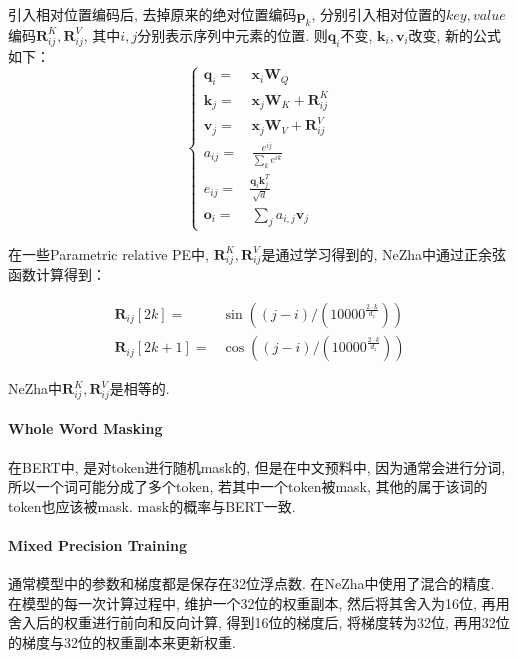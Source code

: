 引入相对位置编码后, 去掉原来的绝对位置编码$\boldsymbol{p}_k$, 分别引入相对位置的$key, value$编码$\boldsymbol{R}_{ij}^K, \boldsymbol{R}_{ij}^V$, 其中$i, j$分别表示序列中元素的位置. 则$\boldsymbol{q}_i$不变, $\boldsymbol{k}_i, \boldsymbol{v}_i$改变, 新的公式如下：
$$
\begin{equation}\nonumber
	\left\{
	\begin{aligned} 
		\boldsymbol{q}_i =&\, \boldsymbol{x}_i \boldsymbol{W}_Q \\ 
		\boldsymbol{k}_j =&\, \boldsymbol{x}_j \boldsymbol{W}_K + \boldsymbol{R}_{ij}^K \\ 
		\boldsymbol{v}_j =&\, \boldsymbol{x}_j \boldsymbol{W}_V + \boldsymbol{R}_{ij}^V \\ 
		a_{ij} =&\, \frac{e^{ij}}{\sum_k e^{ik}}\\ 
		e_{ij} =& \frac{\boldsymbol{q}_i \boldsymbol{k}_j^T}{\sqrt{d}}\\
		\boldsymbol{o}_i =&\, \sum_j a_{i,j}\boldsymbol{v}_j 
	\end{aligned}\right.
\end{equation}
$$

在一些Parametric relative PE中, $\boldsymbol{R}_{ij}^K, \boldsymbol{R}_{ij}^V$是通过学习得到的, NeZha中通过正余弦函数计算得到：

\begin{equation}
	\begin{aligned}
		\boldsymbol{R}_{ij}[2 k] =& \sin \left((j-i) /\left(10000^{\frac{2 \cdot k}{d_{z}}}\right)\right) \\
		\boldsymbol{R}_{ij}[2 k+1] =& \cos \left((j-i) /\left(10000^{\frac{2 \cdot k}{d_{z}}}\right)\right)
	\end{aligned}
\end{equation}

NeZha中$\boldsymbol{R}_{ij}^K, \boldsymbol{R}_{ij}^V$是相等的. 

\paragraph{Whole Word Masking}
在BERT中, 是对token进行随机mask的, 但是在中文预料中, 因为通常会进行分词, 所以一个词可能分成了多个token, 若其中一个token被mask, 其他的属于该词的token也应该被mask. mask的概率与BERT一致. 

\paragraph{Mixed Precision Training}
通常模型中的参数和梯度都是保存在32位浮点数. 在NeZha中使用了混合的精度. 在模型的每一次计算过程中, 维护一个32位的权重副本, 然后将其舍入为16位, 再用舍入后的权重进行前向和反向计算, 得到16位的梯度后, 将梯度转为32位, 再用32位的梯度与32位的权重副本来更新权重. 

